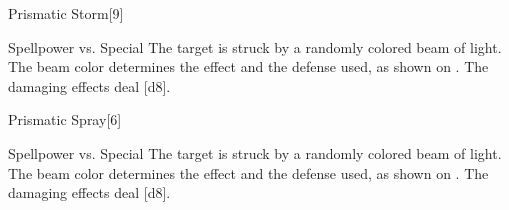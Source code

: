 \begin{spellsection}{Prismatic Storm}[9]
    \begin{spellheader}
    \end{spellheader}
    \begin{spellcontent}
        \begin{spelltargetinginfo}
        \end{spelltargetinginfo}
        \begin{spelleffects}
            \begin{spellattack}{Spellpower vs. Special}
                \spellspecial The target is struck by a randomly colored beam of light. The beam color determines the effect and the defense used, as shown on . The damaging effects deal \spelldamage{}[d8].
            \end{spellattack}
        \end{spelleffects}
    \end{spellcontent}
    \begin{spellfooter}
        \miscastyou
    \end{spellfooter}
\end{spellsection}

\begin{spellsection}{Prismatic Spray}[6]
    \begin{spellheader}
    \end{spellheader}
    \begin{spellcontent}
        \begin{spelltargetinginfo}
        \end{spelltargetinginfo}
        \begin{spelleffects}
            \begin{spellattack}{Spellpower vs. Special}
                \spellspecial The target is struck by a randomly colored beam of light. The beam color determines the effect and the defense used, as shown on . The damaging effects deal \spelldamage{}[d8].
            \end{spellattack}
        \end{spelleffects}
    \end{spellcontent}
    \begin{spellfooter}
        \miscastexplode
    \end{spellfooter}
\end{spellsection}

